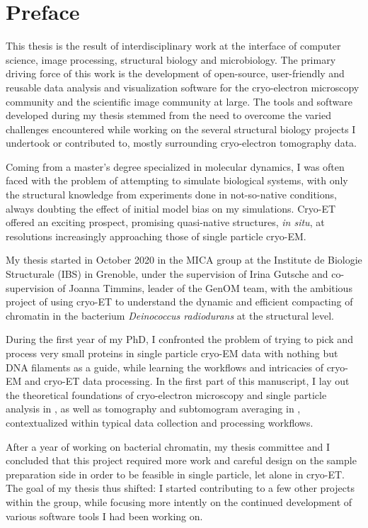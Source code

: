 \chapter{Preface}

This thesis is the result of interdisciplinary work at the interface of computer science, image processing, structural biology and microbiology.
The primary driving force of this work is the development of open-source, user-friendly and reusable data analysis and visualization software for the cryo-electron microscopy community and the scientific image community at large.
The tools and software developed during my thesis stemmed from the need to overcome the varied challenges encountered while working on the several structural biology projects I undertook or contributed to, mostly surrounding cryo-electron tomography data.

Coming from a master's degree specialized in molecular dynamics, I was often faced with the problem of attempting to simulate biological systems, with only the structural knowledge from experiments done in not-so-native conditions, always doubting the effect of initial model bias on my simulations.
Cryo-ET offered an exciting prospect, promising quasi-native structures, \textit{in situ}, at resolutions increasingly approaching those of single particle cryo-EM.

My thesis started in October 2020 in the MICA group at the Institute de Biologie Structurale (IBS) in Grenoble, under the supervision of Irina Gutsche and co-supervision of Joanna Timmins, leader of the GenOM team, with the ambitious project of using cryo-ET to understand the dynamic and efficient compacting of chromatin in the bacterium \textit{Deinococcus radiodurans} at the structural level.

During the first year of my PhD, I confronted the problem of trying to pick and process very small proteins in single particle cryo-EM data with nothing but DNA filaments as a guide, while learning the workflows and intricacies of cryo-EM and cryo-ET data processing.
In the first part of this manuscript, I lay out the theoretical foundations of cryo-electron microscopy and single particle analysis in , as well as tomography and subtomogram averaging in , contextualized within typical data collection and processing workflows.

After a year of working on bacterial chromatin, my thesis committee and I concluded that this project required more work and careful design on the sample preparation side in order to be feasible in single particle, let alone in cryo-ET.
The goal of my thesis thus shifted: I started contributing to a few other projects within the group, while focusing more intently on the continued development of various software tools I had been working on.

